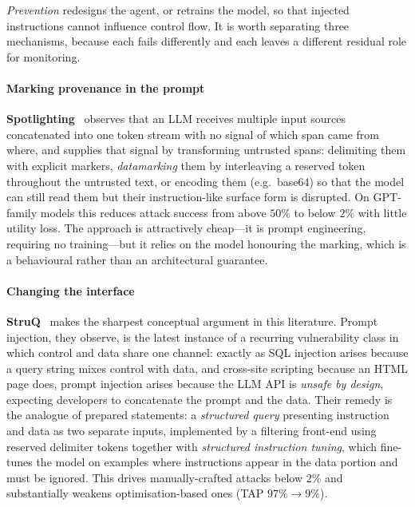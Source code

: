 \documentclass[preprint,12pt,authoryear]{elsarticle}
\theoremstyle{definition}
\begin{document}
\emph{Prevention} redesigns the agent, or retrains the model, so that injected
instructions cannot influence control flow. It is worth separating three
mechanisms, because each fails differently and each leaves a different residual
role for monitoring.

\paragraph{Marking provenance in the prompt}
\textbf{Spotlighting}~\citep{hines2024spotlighting} observes that an LLM receives
multiple input sources concatenated into one token stream with no signal of which
span came from where, and supplies that signal by transforming untrusted spans:
delimiting them with explicit markers, \emph{datamarking} them by interleaving a
reserved token throughout the untrusted text, or encoding them (e.g.\ base64) so
that the model can still read them but their instruction-like surface form is
disrupted. On GPT-family models this reduces attack success from above $50\%$ to
below $2\%$ with little utility loss. The approach is attractively cheap---it is
prompt engineering, requiring no training---but it relies on the model honouring
the marking, which is a behavioural rather than an architectural guarantee.

\paragraph{Changing the interface}
\textbf{StruQ}~\citep{chen2025struq} makes the sharpest conceptual argument in
this literature. Prompt injection, they observe, is the latest instance of a
recurring vulnerability class in which control and data share one channel:
exactly as SQL injection arises because a query string mixes control with data,
and cross-site scripting because an HTML page does, prompt injection arises
because the LLM API is \emph{unsafe by design}, expecting developers to
concatenate the prompt and the data. Their remedy is the analogue of prepared
statements: a \emph{structured query} presenting instruction and data as two
separate inputs, implemented by a filtering front-end using reserved delimiter
tokens together with \emph{structured instruction tuning}, which fine-tunes the
model on examples where instructions appear in the data portion and must be
ignored. This drives manually-crafted attacks below $2\%$ and substantially
weakens optimisation-based ones (TAP $97\% \to 9\%$).
\end{document}
